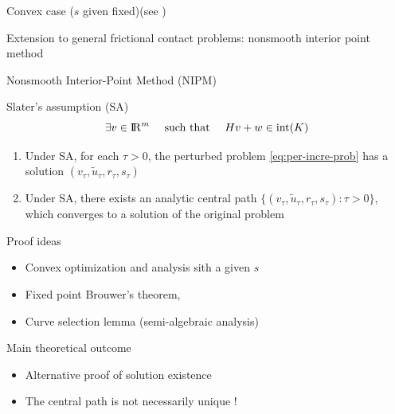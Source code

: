 \begin{frame}
\begin{block}{Convex case ($s$ given  fixed)(see \cite{acary:hal-03913568})}
    \end{block}
   Extension to general frictional contact problems: nonsmooth interior point method

  
\end{frame}

\begin{frame}{Nonsmooth Interior-Point Method (NIPM)}
  \begin{block}{Slater's assumption (SA)}
    $$\exists v \in \mathrm{I\!R}^m \quad \text{ such that } \quad Hv+w \in \mbox{int}({K})$$
    \vspace{-12pt}
  \end{block}
    \begin{theorem}
        \begin{enumerate}
            \item Under SA, for each $\tau > 0$, the perturbed problem \eqref{eq:per-incre-prob} has a solution $(v_\tau,\tilde{u}_\tau,r_\tau,s_\tau)$ \\[6pt]
            \item Under SA, there exists an analytic central path $\{(v_\tau,\tilde{u}_\tau,r_\tau,s_\tau): \tau>0\}$, which converges to a solution of the original problem
        \end{enumerate}
      \end{theorem}
      \begin{block}{Proof ideas}
        \begin{itemize}
        \item Convex optimization and analysis sith a given $s$
        \item Fixed point  Brouwer's theorem,
        \item Curve selection lemma (semi-algebraic analysis)
        \end{itemize}
      \end{block}

      \begin{block}{Main theoretical outcome}
        \begin{itemize}
        \item Alternative proof of solution existence
        \item  The central path is not necessarily unique !
        \end{itemize}
      \end{block}
\end{frame}


